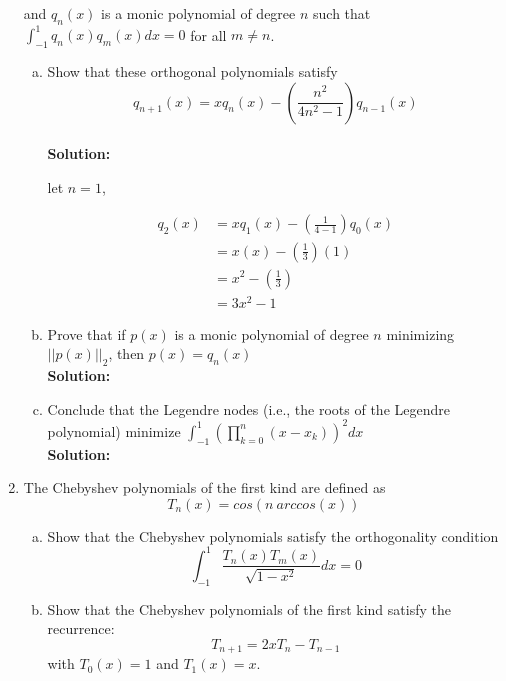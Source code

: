 \documentclass{article}
\begin{document}
\begin{enumerate}
and $q_{n}(x)$ is a monic polynomial of degree $n$ such that $\displaystyle \int_{-1}^{1} q_{n}(x) q_{m}(x) dx = 0 $ for all $m \neq n$.

\begin{enumerate}[(a)]
\item Show that these orthogonal polynomials satisfy
    $$q_{n+1}(x) = x q_{n}(x) - \left(\frac{n^{2}}{4n^{2} - 1} \right) q_{n-1}(x)$$ \\

\textbf{Solution:}

let $n = 1$, 

        \begin{align*}
            q_{2}(x) &= x q_{1}(x) - \left(\frac{1}{4 - 1}\right) q_{0}(x) \\
            &= x(x) - \left(\frac{1}{3}\right) (1) \\
            &= x^{2} - \left(\frac{1}{3}\right) \\
            &= 3x^{2} - 1
        \end{align*}

\item Prove that if $p(x)$ is a monic polynomial of degree $n$ minimizing $||p(x)||_{2}$, then $p(x) = q_{n}(x)$ \\

\textbf{Solution:}



\item Conclude that the Legendre nodes (i.e., the roots of the Legendre polynomial) minimize $\displaystyle \int_{-1}^{1} \left( \prod_{k=0}^{n} (x-x_{k}) \right)^{2} dx$ \\

\textbf{Solution:}




\end{enumerate}


\item The Chebyshev polynomials of the first kind are defined as
    $$T_{n}(x) = cos(n \ arccos(x))$$

\begin{enumerate}[(a)]
\item Show that the Chebyshev polynomials satisfy the orthogonality condition
    $$\displaystyle \int_{-1}^{1} \frac{T_{n}(x) T_{m}(x)}{\sqrt{1 - x^{2}}} dx = 0$$

\item Show that the Chebyshev polynomials of the first kind satisfy the recurrence:
    $$T_{n+1} = 2xT_{n} - T_{n-1}$$
with $T_{0}(x) = 1$ and $T_{1}(x) = x$.


\end{enumerate}
\end{enumerate}
\end{document}
